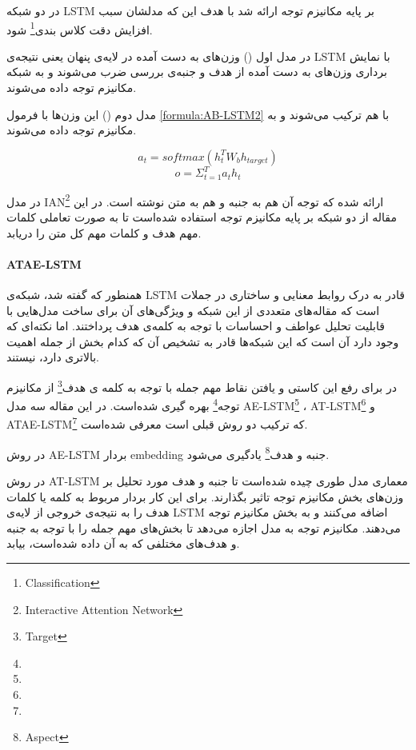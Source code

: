 \documentclass[12pt, a4paper, oneside]{report}
\begin{document}
در
\cite{74YANGATT}
دو شبکه
LSTM
بر پایه مکانیزم توجه ارائه شد با هدف این که مدلشان سبب افزایش دقت کلاس بندی\footnote{Classification}
شود.

در مدل اول
()
وزن‌های به دست آمده در لایه‌ی پنهان یعنی نتیجه‌ی
LSTM
با نمایش برداری وزن‌های به دست آمده از هدف و جنبه‌ی بررسی ضرب می‌شوند و به شبکه
مکانیزم توجه داده می‌شوند.

مدل دوم 
()
این وزن‌ها با فرمول 
\ref{formula:AB-LSTM2}
با هم ترکیب می‌شوند و به مکانیزم توجه داده می‌شوند.

\begin{equation}
    a_t=softmax(h_t^TW_bh_{target})
\end{equation}
\begin{equation}
    o={\Sigma_{t=1}^T a_th_t }
    \label{formula:AB-LSTM2}
\end{equation}

در
\cite{79ma2017interactive}
مدل
IAN\footnote{Interactive Attention Network}
ارائه شده که توجه آن هم به جنبه و هم به متن نوشته است.
در این مقاله از دو شبکه بر پایه مکانیزم توجه استفاده شده‌است تا به صورت تعاملی کلمات مهم هدف و کلمات مهم
کل متن را دریابد.


\paragraph{ATAE-LSTM} \hfill \break

همنطور که گفته شد، شبکه‌ی
LSTM
قادر به درک روابط معنایی و ساختاری در جملات است که مقاله‌های متعددی از این شبکه و ویژگی‌های آن برای
ساخت مدل‌هایی با قابلیت تحلیل عواطف و احساسات با توجه به کلمه‌ی هدف پرداختند. اما نکته‌ای که وجود دارد آن است
که این شبکه‌ها قادر به تشخیص آن که کدام بخش از جمله اهمیت بالاتری دارد، نیستند.

در
\cite{73wang-etal-2016-attention}
برای رفع این کاستی و یافتن نقاط مهم جمله با توجه به کلمه ی هدف\footnote{Target}
از مکانیزم توجه\footnote{}
بهره گیری شده‌است. در این مقاله سه مدل
AE-LSTM\footnote{}
،
AT-LSTM\footnote{}
و
ATAE-LSTM\footnote{}
که ترکیب دو روش قبلی است معرفی شده‌است.

در روش
AE-LSTM
بردار
embedding
جنبه و هدف\footnote{Aspect}
یادگیری می‌شود.

در روش
AT-LSTM
معماری مدل طوری چیده شده‌است تا جنبه و هدف مورد تحلیل بر وزن‌های بخش مکانیزم توجه تاثیر بگذارند. برای این
کار بردار مربوط به کلمه یا کلمات هدف را به نتیجه‌ی خروجی از لایه‌ی
LSTM
اضافه می‌کنند و به بخش مکانیزم توجه می‌دهند. مکانیزم توجه به مدل اجازه می‌دهد تا بخش‌های مهم جمله را
با توجه به جنبه و هدف‌های مختلفی که به آن داده شده‌است، بیابد.
\end{document}
